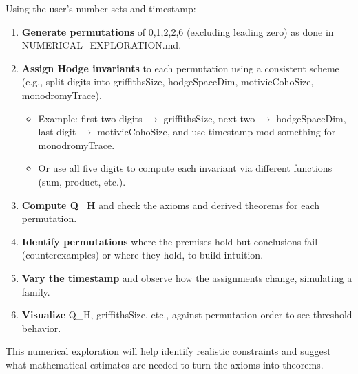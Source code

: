 \documentclass[11pt]{article}
\begin{document}
Using the user's number sets and timestamp:

\begin{enumerate}
\item \textbf{Generate permutations} of {0,1,2,2,6} (excluding leading zero) as done in NUMERICAL\_EXPLORATION.md.
\item \textbf{Assign Hodge invariants} to each permutation using a consistent scheme (e.g., split digits into griffithsSize, hodgeSpaceDim, motivicCohoSize, monodromyTrace).
  \begin{itemize}
  \item Example: first two digits $\rightarrow$ griffithsSize, next two $\rightarrow$ hodgeSpaceDim, last digit $\rightarrow$ motivicCohoSize, and use timestamp mod something for monodromyTrace.
  \item Or use all five digits to compute each invariant via different functions (sum, product, etc.).
  \end{itemize}
\item \textbf{Compute Q\_H} and check the axioms and derived theorems for each permutation.
\item \textbf{Identify permutations} where the premises hold but conclusions fail (counterexamples) or where they hold, to build intuition.
\item \textbf{Vary the timestamp} and observe how the assignments change, simulating a family.
\item \textbf{Visualize} Q\_H, griffithsSize, etc., against permutation order to see threshold behavior.
\end{enumerate}

This numerical exploration will help identify realistic constraints and suggest what mathematical estimates are needed to turn the axioms into theorems.
\end{document}
